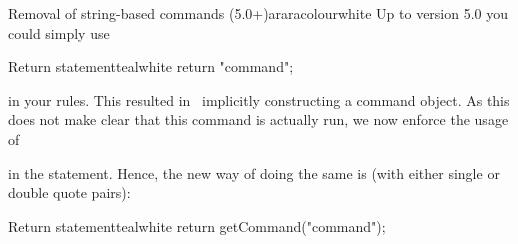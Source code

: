 \begin{messagebox}{Removal of string-based commands (5.0+)}{araracolour}{\icinfo}{white}
Up to version 5.0 you could simply use

\begin{codebox}{Return statement}{teal}{\icnote}{white}
return "command";
\end{codebox}

\noindent in your rules. This resulted in \arara\ implicitly constructing a command object. As this does not make clear that this command is actually run, we now enforce the usage of

\vspace{1em}


\vspace{1em}

\noindent in the  statement. Hence, the new way of doing the same is (with either single or double quote pairs):

\begin{codebox}{Return statement}{teal}{\icnote}{white}
return getCommand("command");
\end{codebox}
\end{messagebox}

